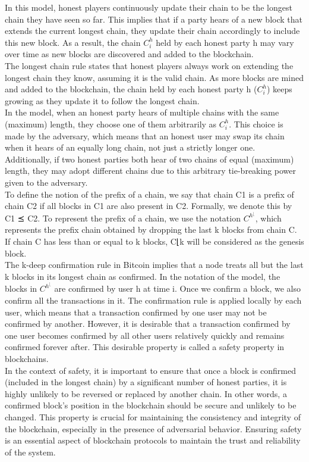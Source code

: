 In this model, honest players continuously update their chain to be the longest chain they have seen so far. This implies that if a party hears of a new block that extends the current longest chain, they update their chain accordingly to include this new block. As a result, the chain $C_{i}^{h}$ held by each honest party h may vary over time as new blocks are discovered and added to the blockchain.\\
The longest chain rule states that honest players always work on extending the longest chain they know, assuming it is the valid chain. As more blocks are mined and added to the blockchain, the chain held by each honest party h ($C_{i}^{h}$) keeps growing as they update it to follow the longest chain.\\
In the model, when an honest party hears of multiple chains with the same (maximum) length, they choose one of them arbitrarily as $C_{i}^{h}$. This choice is made by the adversary, which means that an honest user may swap its chain when it hears of an equally long chain, not just a strictly longer one. Additionally, if two honest parties both hear of two chains of equal (maximum) length, they may adopt different chains due to this arbitrary tie-breaking power given to the adversary.\\
To define the notion of the prefix of a chain, we say that chain C1 is a prefix of chain C2 if all blocks in C1 are also present in C2. Formally, we denote this by C1 ⪯ C2. To represent the prefix of a chain, we use the notation $C^{h^{⌊}}$, which represents the prefix chain obtained by dropping the last k blocks from chain C. If chain C has less than or equal to k blocks, C⌊k will be considered as the genesis block.\\
The k-deep confirmation rule in Bitcoin implies that a node treats all but the last k blocks in its longest chain as confirmed. In the notation of the model, the blocks in $C^{h^{⌊}}$ are confirmed by user h at time i. Once we confirm a block, we also confirm all the transactions in it. The confirmation rule is applied locally by each user, which means that a transaction confirmed by one user may not be confirmed by another. However, it is desirable that a transaction confirmed by one user becomes confirmed by all other users relatively quickly and remains confirmed forever after. This desirable property is called a safety property in blockchains.\\
In the context of safety, it is important to ensure that once a block is confirmed (included in the longest chain) by a significant number of honest parties, it is highly unlikely to be reversed or replaced by another chain. In other words, a confirmed block's position in the blockchain should be secure and unlikely to be changed. This property is crucial for maintaining the consistency and integrity of the blockchain, especially in the presence of adversarial behavior. Ensuring safety is an essential aspect of blockchain protocols to maintain the trust and reliability of the system.
